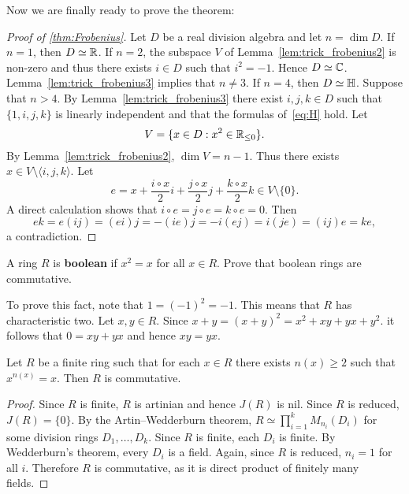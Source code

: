 Now we are finally 
ready to prove the theorem: 

\begin{proof}[Proof of \ref{thm:Frobenius}]
	Let $D$ be a real division algebra and let $n=\dim D$. If $n=1$, then 
	$D\simeq\mathbb{R}$. If $n=2$, the subspace $V$ of Lemma~\ref{lem:trick_frobenius2} 
	is non-zero and thus there exists $i\in D$ such that 
	$i^2=-1$. Hence $D\simeq\mathbb{C}$. Lemma~\ref{lem:trick_frobenius3}
	implies that $n\ne3$. If $n=4$, then $D\simeq\mathbb{H}$. Suppose that 
	$n>4$.  By Lemma~\ref{lem:trick_frobenius3} there exist
	$i,j,k\in D$ such that $\{1,i,j,k\}$ is linearly independent 
	and that the formulas of~\eqref{eq:H} hold. Let 
	\[
		V=\{x\in D:x^2\in\mathbb{R}_{\leq0}\}.
	\]
	By Lemma~\ref{lem:trick_frobenius2}, $\dim V=n-1$. Thus there exists 
	$x\in V\setminus\langle i,j,k\rangle$. Let 
	\[
		e=x+\frac{i\circ x}{2}i+\frac{j\circ x}{2}j+\frac{k\circ x}{2}k\in V\setminus\{0\}.
	\]
	A direct calculation shows that $i\circ e=j\circ e=k\circ e=0$. Then 
	\[
		ek=e(ij)=(ei)j=-(ie)j=-i(ej)=i(je)=(ij)e=ke,
	\]
	a contradiction. 
\end{proof}


\begin{exercise}
    A ring $R$ is \textbf{boolean} if $x^2=x$ for all $x\in R$. 
    Prove that boolean rings are commutative. 
\end{exercise}

To prove this fact, note that $1=(-1)^2=-1$. This means that $R$ has
characteristic two. Let $x,y\in R$. Since $x+y=(x+y)^2=x^2+xy+yx+y^2$. 
it follows that $0=xy+yx$ and hence $xy=yx$.

%

\begin{proposition}
\label{pro:Jacobson}
    Let $R$ be a finite ring such that 
    for each $x\in R$ there exists $n(x)\geq2$ such that 
    $x^{n(x)}=x$. Then $R$ is commutative. 
\end{proposition}

\begin{proof}
    Since $R$ is finite, $R$ is artinian and hence $J(R)$ is nil. 
    Since $R$ is reduced, $J(R)=\{0\}$. 
    By the Artin--Wedderburn theorem, $R\simeq\prod_{i=1}^k M_{n_i}(D_i)$ for some division rings $D_1,\dots,D_k$. 
    Since $R$ is finite, each $D_i$ is finite. By Wedderburn's theorem,
    every $D_i$ is a field. Again, since $R$ is reduced, 
    $n_i=1$ for all $i$. Therefore $R$ is commutative, as it is 
    direct product of finitely many fields.
\end{proof}

